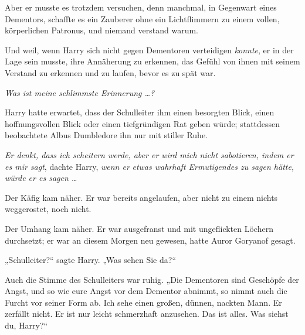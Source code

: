 Aber er musste es trotzdem versuchen, denn manchmal, in Gegenwart eines Dementors, schaffte es ein Zauberer ohne ein Lichtflimmern zu einem vollen, körperlichen Patronus, und niemand verstand warum.

Und weil, wenn Harry sich nicht gegen Dementoren verteidigen \emph{konnte}, er in der Lage sein musste, ihre Annäherung zu erkennen, das Gefühl von ihnen mit seinem Verstand zu erkennen und zu laufen, bevor es zu spät war.

\emph{Was ist meine schlimmste Erinnerung …?}

Harry hatte erwartet, dass der Schulleiter ihm einen besorgten Blick, einen hoffnungsvollen Blick oder einen tiefgründigen Rat geben würde; stattdessen beobachtete Albus Dumbledore ihn nur mit stiller Ruhe.

\emph{Er denkt, dass ich scheitern werde, aber er wird mich nicht sabotieren, indem er es mir sagt}, dachte Harry, \emph{wenn er} \emph{etwas wahrhaft Ermutigendes zu sagen hätte, würde er es sagen …}

Der Käfig kam näher. Er war bereits angelaufen, aber nicht zu einem nichts weggerostet, noch nicht.

Der Umhang kam näher. Er war ausgefranst und mit ungeflickten Löchern durchsetzt; er war an diesem Morgen neu gewesen, hatte Auror Goryanof gesagt.

„Schulleiter?“ sagte Harry.
„Was sehen Sie da?“

Auch die Stimme des Schulleiters war ruhig.
„Die Dementoren sind Geschöpfe der Angst, und so wie eure Angst vor dem Dementor abnimmt, so nimmt auch die Furcht vor seiner Form ab. Ich sehe einen großen, dünnen, nackten Mann. Er zerfällt nicht. Er ist nur leicht schmerzhaft anzusehen. Das ist alles. Was siehst du, Harry?“

